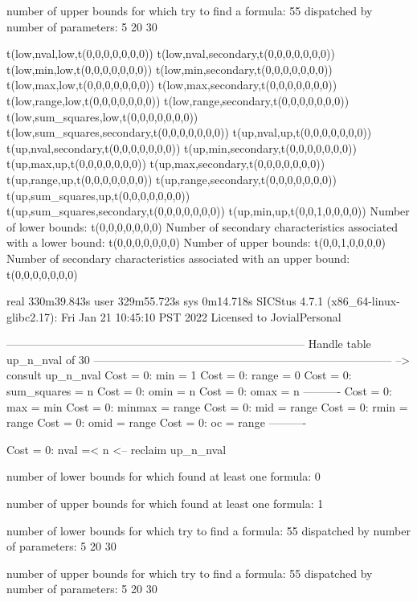 number of upper bounds for which try to find a formula: 55
dispatched by number of parameters: 5  20  30

t(low,nval,low,t(0,0,0,0,0,0,0))
t(low,nval,secondary,t(0,0,0,0,0,0,0))
t(low,min,low,t(0,0,0,0,0,0,0))
t(low,min,secondary,t(0,0,0,0,0,0,0))
t(low,max,low,t(0,0,0,0,0,0,0))
t(low,max,secondary,t(0,0,0,0,0,0,0))
t(low,range,low,t(0,0,0,0,0,0,0))
t(low,range,secondary,t(0,0,0,0,0,0,0))
t(low,sum_squares,low,t(0,0,0,0,0,0,0))
t(low,sum_squares,secondary,t(0,0,0,0,0,0,0))
t(up,nval,up,t(0,0,0,0,0,0,0))
t(up,nval,secondary,t(0,0,0,0,0,0,0))
t(up,min,secondary,t(0,0,0,0,0,0,0))
t(up,max,up,t(0,0,0,0,0,0,0))
t(up,max,secondary,t(0,0,0,0,0,0,0))
t(up,range,up,t(0,0,0,0,0,0,0))
t(up,range,secondary,t(0,0,0,0,0,0,0))
t(up,sum_squares,up,t(0,0,0,0,0,0,0))
t(up,sum_squares,secondary,t(0,0,0,0,0,0,0))
t(up,min,up,t(0,0,1,0,0,0,0))
Number of lower bounds:                                             t(0,0,0,0,0,0,0)
Number of secondary characteristics associated with a lower bound:  t(0,0,0,0,0,0,0)
Number of upper bounds:                                             t(0,0,1,0,0,0,0)
Number of secondary characteristics associated with an upper bound: t(0,0,0,0,0,0,0)

real	330m39.843s
user	329m55.723s
sys	0m14.718s
SICStus 4.7.1 (x86_64-linux-glibc2.17): Fri Jan 21 10:45:10 PST 2022
Licensed to JovialPersonal


--------------------------------------------------------------------------------
Handle table up_n_nval of 30
--------------------------------------------------------------------------------
--> consult up_n_nval
Cost =  0:  min         = 1
Cost =  0:  range       = 0
Cost =  0:  sum_squares = n
Cost =  0:  omin        = n
Cost =  0:  omax        = n
----------
Cost =  0:  max         = min
Cost =  0:  minmax      = range
Cost =  0:  mid         = range
Cost =  0:  rmin        = range
Cost =  0:  omid        = range
Cost =  0:  oc          = range
----------

Cost =  0:  nval =< n
<-- reclaim up_n_nval

number of lower bounds for which found at least one formula: 0

number of upper bounds for which found at least one formula: 1

number of lower bounds for which try to find a formula: 55
dispatched by number of parameters: 5  20  30

number of upper bounds for which try to find a formula: 55
dispatched by number of parameters: 5  20  30


